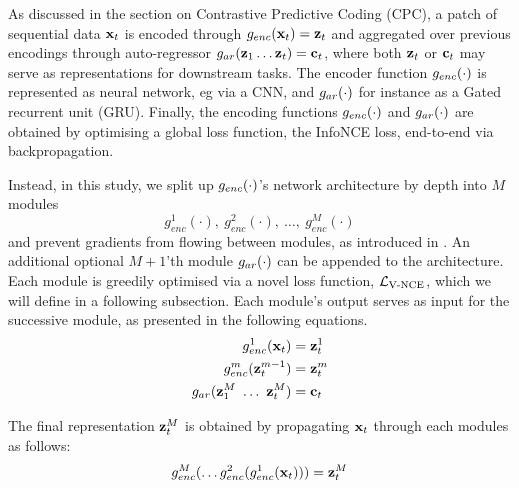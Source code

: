 		
		As discussed in the section on Contrastive Predictive Coding (CPC), a patch of sequential data $\mathbf{x}_t$ is encoded through $g_{enc}(\mathbf{x}_t) = \mathbf{z}_t$ and aggregated over previous encodings through auto-regressor $g_{ar}(\mathbf{z}_1  \dots \mathbf{z}_t) = \mathbf{c}_t$, where both $\mathbf{z}_t$ or $\mathbf{c}_t$ may serve as representations for downstream tasks. The encoder function $g_{enc}(\cdot)$ is represented as neural network, eg via a CNN, and $g_{ar}(\cdot)$ for instance as a Gated recurrent unit (GRU).
		Finally, the encoding functions $g_{enc}(\cdot)$ and $g_{ar}(\cdot)$ are obtained by optimising a global loss function, the InfoNCE loss, end-to-end via backpropagation. 

			Instead, in this study, we split up $g_{enc}(\cdot)$'s network architecture by depth into $M$ modules 
			$$g_{enc}^1(\cdot),~ g_{enc}^2(\cdot),~\dots,~g_{enc}^M(\cdot)$$ 
			and prevent gradients from flowing between modules, as introduced in \cite{lowePuttingEndEndtoEnd2020}. An additional optional $M \! + \! 1$'th module $g_{ar}(\cdot)$ can be appended to the architecture. Each module is greedily optimised via a novel loss function, $\mathcal{L}_{\text{V-NCE}}$, which we will define in a following subsection. Each module's output serves as input for the successive module, as presented in the following equations. %
			\begin{align*} %
				g_{enc}^1(\xt) &= \zt^1 \\
				g_{enc}^m(\zt^{m-1}) &= \zt^m \\
				g_{ar}(\z_1^M ~ \dots ~ \zt^M) &= \ct
			\end{align*}
			
			The final representation $\mathbf{z}_t^M$ is obtained by propagating $\mathbf{x}_t$ through each modules as follows:
			$$ g_{enc}^M ( \dots	g_{enc}^2(g_{enc}^1(\mathbf{x}_t))) = \mathbf{z}_t^M$$
			
			
			
					
